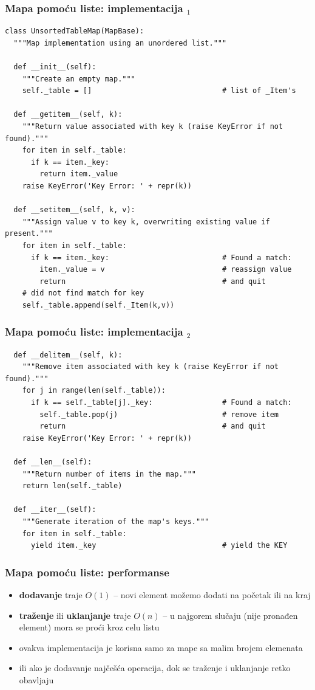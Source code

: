 \documentclass[compress,aspectratio=169]{beamer}
\begin{document}
\begin{frame}
  \frametitle{Mapa pomoću liste: implementacija $_1$}
\begin{verbatim}
class UnsortedTableMap(MapBase):
  """Map implementation using an unordered list."""

  def __init__(self):
    """Create an empty map."""
    self._table = []                              # list of _Item's
  
  def __getitem__(self, k):
    """Return value associated with key k (raise KeyError if not found)."""
    for item in self._table:
      if k == item._key:
        return item._value
    raise KeyError('Key Error: ' + repr(k))

  def __setitem__(self, k, v):
    """Assign value v to key k, overwriting existing value if present."""
    for item in self._table:
      if k == item._key:                          # Found a match:
        item._value = v                           # reassign value
        return                                    # and quit    
    # did not find match for key
    self._table.append(self._Item(k,v))
\end{verbatim}
\end{frame}

\begin{frame}[fragile,shrink=25]
  \frametitle{Mapa pomoću liste: implementacija $_2$}
\begin{verbatim}
  def __delitem__(self, k):
    """Remove item associated with key k (raise KeyError if not found)."""
    for j in range(len(self._table)):
      if k == self._table[j]._key:                # Found a match:
        self._table.pop(j)                        # remove item
        return                                    # and quit    
    raise KeyError('Key Error: ' + repr(k))

  def __len__(self):
    """Return number of items in the map."""
    return len(self._table)

  def __iter__(self):                             
    """Generate iteration of the map's keys."""
    for item in self._table:
      yield item._key                             # yield the KEY
\end{verbatim}
\end{frame}

\begin{frame}[fragile]
  \frametitle{Mapa pomoću liste: performanse}
  \begin{itemize}
    \item \textbf{dodavanje} traje $O(1)$ -- novi element možemo dodati na početak ili na kraj  
    \item \textbf{traženje} ili \textbf{uklanjanje} traje $O(n)$ -- u najgorem slučaju (nije pronađen element) mora se proći kroz celu listu
    \item ovakva implementacija je korisna samo za mape sa malim brojem elemenata
    \item ili ako je dodavanje najčešća operacija, dok se traženje i uklanjanje retko obavljaju
  \end{itemize}
\end{frame}
\end{document}
